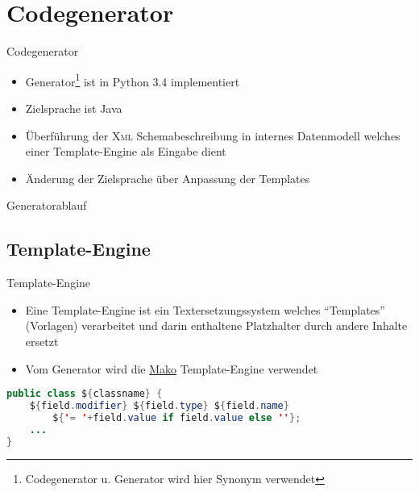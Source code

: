 \section{Codegenerator}
\begin{frame}{Codegenerator}
    \begin{itemize}
        \item Generator\footnote{Codegenerator u. Generator wird hier Synonym verwendet} ist in Python 3.4 implementiert
        \item Zielsprache ist Java
        \item Überführung der \textsc{Xml} Schemabeschreibung in internes Datenmodell welches einer Template-Engine als Eingabe dient
        \item Änderung der Zielsprache über Anpassung der Templates
    \end{itemize}
\end{frame}

\begin{frame}{Generatorablauf}
    \centering
    \resizebox{!}{0.85\textheight}{
        
    }
    \label{fig:flow}
\end{frame}

\subsection{Template-Engine}
\begin{frame}[fragile]{Template-Engine}
    \begin{itemize}
        \item Eine Template-Engine ist ein Textersetzungssystem welches \enquote{Templates} (Vorlagen) verarbeitet und darin enthaltene Platzhalter durch andere Inhalte ersetzt
        \item Vom Generator wird die \href{http://www.makotemplates.org/}{Mako} Template-Engine verwendet
    \end{itemize}
    \begin{lstlisting}[language=Java, caption=Beispieltemplate]
public class ${classname} {
    ${field.modifier} ${field.type} ${field.name}
        ${'= '+field.value if field.value else ''};
    ...
}
    \end{lstlisting}
\end{frame}
